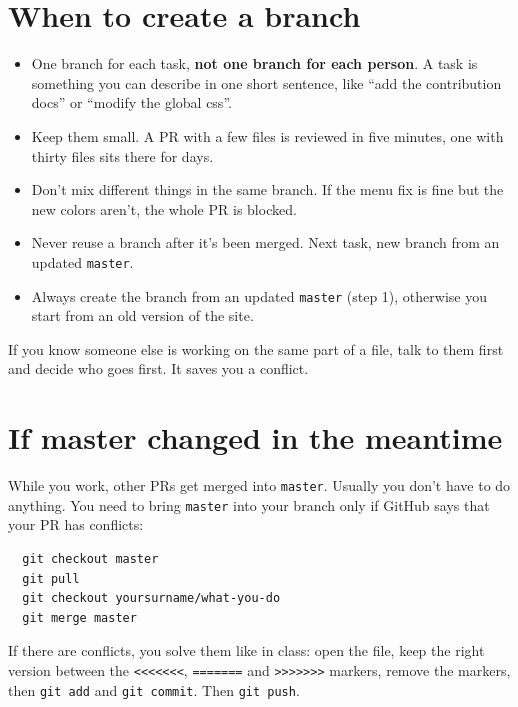 \documentclass[11pt, a4paper]{article}
\begin{document}
\section{When to create a branch}

\begin{itemize}
  \item One branch for each task, \textbf{not one branch for each person}. A task is something you can describe in one short sentence, like ``add the contribution docs'' or ``modify the global css''.
  \item Keep them small. A PR with a few files is reviewed in five minutes, one with thirty files sits there for days.
  \item Don't mix different things in the same branch. If the menu fix is fine but the new colors aren't, the whole PR is blocked.
  \item Never reuse a branch after it's been merged. Next task, new branch from an updated \texttt{master}.
  \item Always create the branch from an updated \texttt{master} (step 1), otherwise you start from an old version of the site.
\end{itemize}

If you know someone else is working on the same part of a file, talk to them first and decide who goes first. It saves you a conflict.

\section{If master changed in the meantime}

While you work, other PRs get merged into \texttt{master}. Usually you don't have to do anything. You need to bring \texttt{master} into your branch only if GitHub says that your PR has conflicts:
 
\begin{verbatim}
  git checkout master
  git pull
  git checkout yoursurname/what-you-do
  git merge master
\end{verbatim}
 
If there are conflicts, you solve them like in class: open the file, keep the right version between the \texttt{<<<<<<<}, \texttt{=======} and \texttt{>>>>>>>} markers, remove the markers, then \texttt{git add} and \texttt{git commit}. Then \texttt{git push}.

\end{document}
